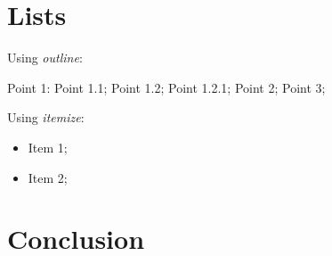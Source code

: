 \documentclass[12pt,a4paper]{article}
\begin{document}
\section{Lists}

\noindent
Using \emph{outline}:

\begin{outline}
  \1 Point 1:
      \2 Point 1.1;
      \2 Point 1.2;
            \3 Point 1.2.1;
  \1 Point 2;
  \1 Point 3;
\end{outline}

\noindent
Using \emph{itemize}:

\begin{itemize}
  \item Item 1;
  \item Item 2;
\end{itemize}



\newpage
\section{Conclusion}

\lipsum[1]
\end{document}
